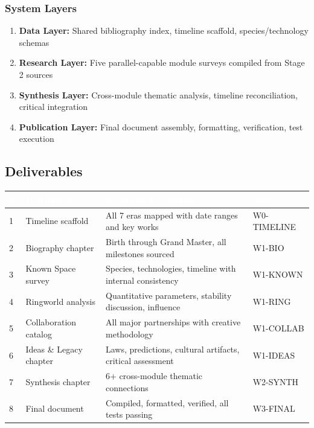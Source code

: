 \documentclass[11pt,letterpaper]{article}
\newcommand{\tableheader}[1]{\textbf{\sffamily\textcolor{white}{#1}}}
\begin{document}
\subsubsection{System Layers}

\begin{enumerate}[leftmargin=2em]
\item \textbf{Data Layer:} Shared bibliography index, timeline scaffold, species/technology schemas
\item \textbf{Research Layer:} Five parallel-capable module surveys compiled from Stage 2 sources
\item \textbf{Synthesis Layer:} Cross-module thematic analysis, timeline reconciliation, critical integration
\item \textbf{Publication Layer:} Final document assembly, formatting, verification, test execution
\end{enumerate}

\subsection{Deliverables}

\begin{center}
\begin{tabularx}{\textwidth}{C{0.5cm}L{3.5cm}XC{2cm}}
\toprule
{}
\tableheader{\#} & \tableheader{Deliverable} & \tableheader{Acceptance Criterion} & \tableheader{Spec} \\
 & Timeline scaffold & All 7 eras mapped with date ranges and key works & W0-TIMELINE \\
2 & Biography chapter & Birth through Grand Master, all milestones sourced & W1-BIO \\
3 & Known Space survey & Species, technologies, timeline with internal consistency & W1-KNOWN \\
4 & Ringworld analysis & Quantitative parameters, stability discussion, influence & W1-RING \\
5 & Collaboration catalog & All major partnerships with creative methodology & W1-COLLAB \\
6 & Ideas \& Legacy chapter & Laws, predictions, cultural artifacts, critical assessment & W1-IDEAS \\
7 & Synthesis chapter & 6+ cross-module thematic connections & W2-SYNTH \\
8 & Final document & Compiled, formatted, verified, all tests passing & W3-FINAL \\
\bottomrule
\end{tabularx}
\end{center}
\end{document}
